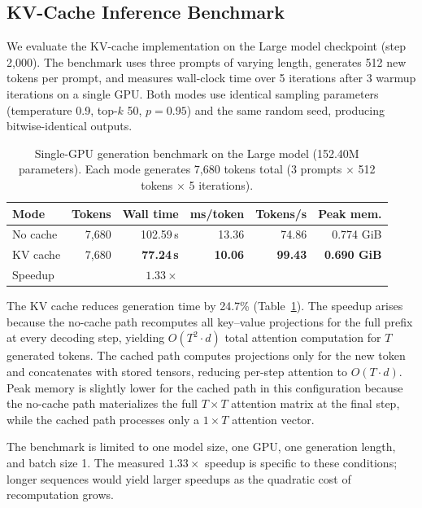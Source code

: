\documentclass{article}
\begin{document}
\subsection{KV-Cache Inference Benchmark}
\label{sec:kv-cache}

We evaluate the KV-cache implementation on the Large model checkpoint (step 2{,}000). The benchmark uses three prompts of varying length, generates 512 new tokens per prompt, and measures wall-clock time over 5 iterations after 3 warmup iterations on a single GPU. Both modes use identical sampling parameters (temperature 0.9, top-$k$ 50, $p{=}0.95$) and the same random seed, producing bitwise-identical outputs.

\begin{table}[H]
\centering
\small
\caption{Single-GPU generation benchmark on the Large model (152.40M parameters). Each mode generates 7{,}680 tokens total (3 prompts $\times$ 512 tokens $\times$ 5 iterations).}
\label{tab:kv-cache}
\begin{tabular}{lrrrrr}
\toprule
Mode & Tokens & Wall time & ms/token & Tokens/s & Peak mem. \\
\midrule
No cache & 7{,}680 & 102.59\,s & 13.36 & 74.86 & 0.774 GiB \\
KV cache & 7{,}680 & \textbf{77.24\,s} & \textbf{10.06} & \textbf{99.43} & \textbf{0.690 GiB} \\
\midrule
\multicolumn{2}{l}{Speedup} & \textbf{$1.33\times$} & & & \\
\bottomrule
\end{tabular}
\end{table}

The KV cache reduces generation time by 24.7\% (Table~\ref{tab:kv-cache}). The speedup arises because the no-cache path recomputes all key--value projections for the full prefix at every decoding step, yielding $O(T^2 \cdot d)$ total attention computation for $T$ generated tokens. The cached path computes projections only for the new token and concatenates with stored tensors, reducing per-step attention to $O(T \cdot d)$. Peak memory is slightly lower for the cached path in this configuration because the no-cache path materializes the full $T \times T$ attention matrix at the final step, while the cached path processes only a $1 \times T$ attention vector.

The benchmark is limited to one model size, one GPU, one generation length, and batch size 1. The measured $1.33\times$ speedup is specific to these conditions; longer sequences would yield larger speedups as the quadratic cost of recomputation grows.
\FloatBarrier
\end{document}
